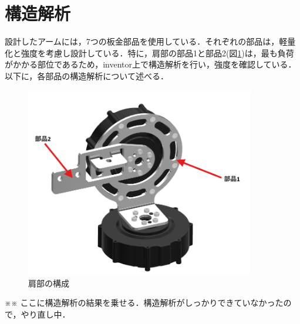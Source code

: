 \section{構造解析}
設計したアームには，7つの板金部品を使用している．それぞれの部品は，軽量化と強度を考慮し設計している．特に，肩部の部品1と部品2(図\ref{fig:shoulder})は，最も負荷がかかる部位であるため，inventor上で構造解析を行い，強度を確認している．以下に，各部品の構造解析について述べる．
\begin{figure}[h]
  \centering
  \includegraphics[width=10cm]{images/design/shoulder.png}
  \caption{肩部の構成}
  \label{fig:shoulder}
\end{figure}

※※ ここに構造解析の結果を乗せる．構造解析がしっかりできていなかったので，やり直し中．

\newpage